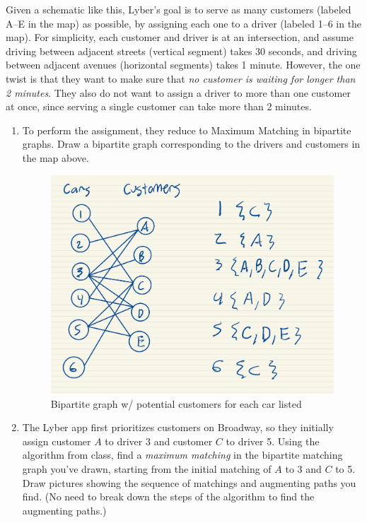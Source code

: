 \documentclass[11pt]{article}
\begin{document}
\begin{enumerate}
    Given a schematic like this, Lyber's goal is to serve as many customers (labeled A--E in the map) as possible, by assigning each one to a driver (labeled 1--6 in the map). For simplicity, each customer and driver is at an intersection, and assume driving between adjacent streets (vertical segment) takes 30 seconds, and driving between adjacent avenues (horizontal segments) takes 1 minute. However, the one twist is that they want to make sure that \textit{no customer is waiting for longer than 2 minutes}.  They also do not want to assign a driver to more than one customer at once, since serving a single customer can take more than 2 minutes.

    \begin{enumerate}
        \item To perform the assignment, they reduce to Maximum Matching in bipartite graphs.  Draw a bipartite graph corresponding to the drivers and customers in the map above.

    \begin{figure}[H]
        \centering
        \includegraphics[width=0.75\linewidth]{42646.jpg}
        \caption{Bipartite graph w/ potential customers for each car listed}
        \label{fig:enter-label}
    \end{figure}
        
        \item The Lyber app first prioritizes customers on Broadway, so they initially assign customer $A$ to driver 3 and customer $C$ to driver 5. Using the algorithm from class, find a \textit{maximum matching} in the bipartite matching graph you've drawn, starting from the initial matching of $A$ to 3 and $C$ to 5. Draw pictures showing the sequence of matchings and augmenting paths you find. (No need to break down the steps of the algorithm to find the augmenting paths.) \\


\end{enumerate}
\end{enumerate}
\end{document}
